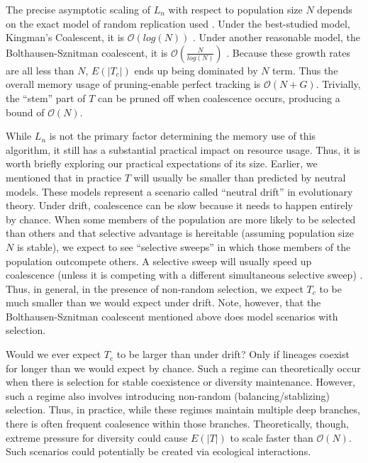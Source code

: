 The precise asymptotic scaling of $L_n$ with respect to population size $N$ depends on the exact model of random replication used \citep{tellierCoalescenceMultipleBranching2014}.
Under the best-studied model, Kingman's Coalescent, it is $\mathcal{O}(log(N))$ \citep{kingmanCoalescent1982, delmasAsymptoticResultsLength2008}.
Under another reasonable model, the Bolthausen-Sznitman coalescent, it is $\mathcal{O}(\frac{N}{log(N)})$ \citep{drmotaAsymptoticResultsConcerning2007}.
Because these growth rates are all less than $N$, $E(|T_c|)$ ends up being dominated by $N$ term. 
Thus the overall memory usage of pruning-enable perfect tracking is $\mathcal{O}(N + G)$.
Trivially, the ``stem'' part of $T$ can be pruned off when coalescence occurs, producing a bound of $\mathcal{O}(N)$.

While $L_n$ is not the primary factor determining the memory use of this algorithm, it still has a substantial practical impact on resource usage.
Thus, it is worth briefly exploring our practical expectations of its size.
Earlier, we mentioned that in practice $T$ will usually be smaller than predicted by neutral models.
These models represent a scenario called ``neutral drift'' in evolutionary theory. 
Under drift, coalescence can be slow because it needs to happen entirely by chance.
When some members of the population are more likely to be selected than others and that selective advantage is hereitable (assuming population size $N$ is stable), we expect to see ``selective sweeps'' in which those members of the population outcompete others.
A selective sweep will usually speed up coalescence (unless it is competing with a different simultaneous selective sweep) \citep{neherGeneticDraftSelective2013}.
Thus, in general, in the presence of non-random selection, we expect $T_c$ to be much smaller than we would expect under drift.
Note, however, that the Bolthausen-Sznitman coalescent mentioned above does model scenarios with selection.

Would we ever expect $T_c$ to be larger than under drift?
Only if lineages coexist for longer than we would expect by chance.
Such a regime can theoretically occur when there is selection for stable coexistence or diversity maintenance.
However, such a regime also involves introducing non-random (balancing/stablizing) selection.
Thus, in practice, while these regimes maintain multiple deep branches, there is often frequent coalesence within those branches.
Theoretically, though, extreme pressure for diversity could cause $E(|T|)$ to scale faster than $\mathcal{O}(N)$.
Such scenarios could potentially be created via ecological interactions.

